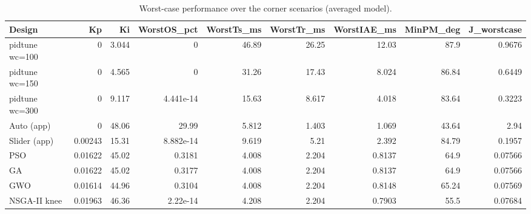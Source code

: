 \begin{table}[t]
\centering\caption{Worst-case performance over the corner scenarios (averaged model).}\label{tab:analytic}
\begin{tabular}{lrrrrrrrr}
\toprule
Design & Kp & Ki & WorstOS\_pct & WorstTs\_ms & WorstTr\_ms & WorstIAE\_ms & MinPM\_deg & J\_worstcase \\
\midrule
pidtune wc=100 & 0 & 3.044 & 0 & 46.89 & 26.25 & 12.03 & 87.9 & 0.9676 \\
pidtune wc=150 & 0 & 4.565 & 0 & 31.26 & 17.43 & 8.024 & 86.84 & 0.6449 \\
pidtune wc=300 & 0 & 9.117 & 4.441e-14 & 15.63 & 8.617 & 4.018 & 83.64 & 0.3223 \\
Auto (app) & 0 & 48.06 & 29.99 & 5.812 & 1.403 & 1.069 & 43.64 & 2.94 \\
Slider (app) & 0.00243 & 15.31 & 8.882e-14 & 9.619 & 5.21 & 2.392 & 84.79 & 0.1957 \\
PSO & 0.01622 & 45.02 & 0.3181 & 4.008 & 2.204 & 0.8137 & 64.9 & 0.07566 \\
GA & 0.01622 & 45.02 & 0.3177 & 4.008 & 2.204 & 0.8137 & 64.9 & 0.07566 \\
GWO & 0.01614 & 44.96 & 0.3104 & 4.008 & 2.204 & 0.8148 & 65.24 & 0.07569 \\
NSGA-II knee & 0.01963 & 46.36 & 2.22e-14 & 4.208 & 2.204 & 0.7903 & 55.5 & 0.07684 \\
\bottomrule
\end{tabular}
\end{table}
